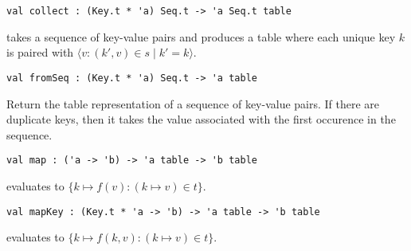 \begin{cluster}
\label{grp:grm:table-interface::collect}

\begin{gram}[collect]
\label{grm:table-interface::collect}
\begin{verbatim}
val collect : (Key.t * 'a) Seq.t -> 'a Seq.t table
\end{verbatim}
 takes a sequence of key-value pairs and produces a table where
each unique key $k$ is paired with
$\langle v : (k',v) \in s \mathbin| k' = k \rangle$.

\end{gram}
\end{cluster}

\begin{cluster}
\label{grp:grm:table-interface::fromseq}

\begin{gram}[fromSeq]
\label{grm:table-interface::fromseq}
\begin{verbatim}
val fromSeq : (Key.t * 'a) Seq.t -> 'a table
\end{verbatim}
Return the table representation of a sequence of key-value pairs. If there are
duplicate keys, then it takes the value associated with the first occurence in
the sequence.

\end{gram}
\end{cluster}

\begin{cluster}
\label{grp:grm:table-interface::map}

\begin{gram}[map]
\label{grm:table-interface::map}
\begin{verbatim}
val map : ('a -> 'b) -> 'a table -> 'b table
\end{verbatim}
 evaluates to $\{k \mapsto f(v) : (k \mapsto v) \in t\}$.

\end{gram}
\end{cluster}

\begin{cluster}
\label{grp:grm:table-interface::mapkey}

\begin{gram}[mapKey]
\label{grm:table-interface::mapkey}
\begin{verbatim}
val mapKey : (Key.t * 'a -> 'b) -> 'a table -> 'b table
\end{verbatim}
 evaluates to $\{k \mapsto f(k, v) : (k \mapsto v) \in t\}$.

\end{gram}
\end{cluster}

